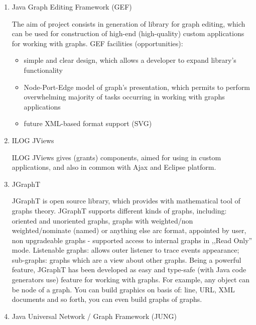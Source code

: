 \begin{enumerate}

\item
Java Graph Editing Framework (GEF)~\cite{GEF}

The aim of project consists in generation of library for graph editing, which can be used for construction of high-end (high-quality) custom applications for working with graphs.
GEF facilities (opportunities):
\begin{itemize}
	\item simple and clear design, which allows a developer to expand library's functionality
	\item Node-Port-Edge model of graph's presentation, which permits to perform overwhelming majority of tasks occurring in working with graphs applications
	\item future XML-based format support (SVG)
\end{itemize}

\item
ILOG JViews~\cite{ILOG_Jview}

ILOG JViews gives (grants) components, aimed for using in custom applications, and also in common with Ajax and Eclipse platform.

\item
JGraphT~\cite{JGraphT}

JGraphT is open source library, which provides with mathematical tool of graphs theory. JGraphT supports different kinds of graphs, including: oriented and unoriented graphs, graphs with weighted/non weighted/nominate (named) or anything else arc format, appointed 	by user, non upgradeable graphs - supported access to internal graphs in ,,Read Only'' mode. Listenable graphs: allows outer listener to trace events appearance; sub-graphs: graphs which are a view about other graphs. Being a powerful feature, JGraphT has been 	developed as easy and type-safe (with Java code generators use) feature for working with 	graphs. For example, any object can be node of a graph. You can build graphics on basis of: line, URL, XML documents and so forth, you can even build graphs of graphs.

\item
Java Universal Network / Graph Framework (JUNG)~\cite{JUNG}


\end{enumerate}
